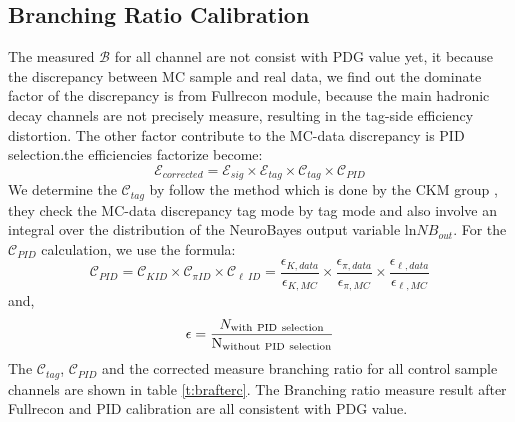 \subsection{Branching Ratio Calibration}
The measured $\mathcal{B}$ for all channel are not consist with PDG value yet, it because the discrepancy between MC sample and real data, we find out the dominate factor of the discrepancy is from  Fullrecon module, because the main hadronic decay channels are not precisely measure, resulting in the tag-side efficiency distortion. The other factor contribute to the MC-data discrepancy is PID selection.the efficiencies factorize become:
\begin{equation}
\label{eq:efficiencycorrect}
\mathcal{E}_{corrected} = \mathcal{E}_{sig} \times \mathcal{E}_{tag} \times \mathcal{C}_{tag} \times \mathcal{C}_{PID}
\end{equation}
We determine the $\mathcal{C}_{tag}$ by follow the method which is done by the CKM group \cite{ref:Varvell2012}, they check the MC-data discrepancy tag mode by tag mode and also involve an integral over the distribution of the NeuroBayes output variable ln$NB_{out}$. For the $\mathcal{C}_{PID}$ calculation, we use the formula:
\begin{equation}
\label{eq:efficiencycorrect}
\mathcal{C}_{PID} = \mathcal{C}_{KID} \times \mathcal{C}_{\pi ID} \times \mathcal{C}_{\ell ~ ID} = \frac{\epsilon_{K,data}}{\epsilon_{K,MC}} \times \frac{\epsilon_{\pi,data}}{\epsilon_{\pi,MC}} \times \frac{\epsilon_{\ell,data}}{\epsilon_{\ell,MC}}
\end{equation}
and, 
\begin{equation}
\label{eq:edefinite}
\epsilon = \frac{N_{\rm{with ~ PID ~ selection}}}{\rm{N_{without ~ PID ~ selection}}}
\end{equation}
The $\mathcal{C}_{tag}$, $\mathcal{C}_{PID}$ and the corrected measure branching ratio for all control sample channels are shown in table  \ref{t:brafterc}. The Branching ratio measure result after Fullrecon and PID calibration are all consistent with PDG value.

